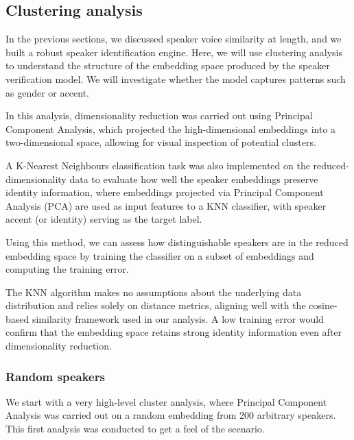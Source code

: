 \documentclass[conference]{IEEEtran}
\begin{document}
	\subsection{Clustering analysis}
	
	In the previous sections, we discussed speaker voice similarity at length, and we built a robust speaker identification engine. Here, we will use clustering analysis to understand the structure of the embedding space produced by the speaker verification model. We will investigate whether the model captures patterns such as gender or accent.
	
	In this analysis, dimensionality reduction was carried out using Principal Component Analysis, which projected the high-dimensional embeddings into a two-dimensional space, allowing for visual inspection of potential clusters.
	
	A K-Nearest Neighbours classification task was also implemented on the reduced-dimensionality data to evaluate how well the speaker embeddings preserve identity information, where embeddings projected via Principal Component Analysis (PCA) are used as input features to a KNN classifier, with speaker accent (or identity) serving as the target label. 
	
	Using this method, we can assess how distinguishable speakers are in the reduced embedding space by training the classifier on a subset of embeddings and computing the training error. 
	
	The KNN algorithm makes no assumptions about the underlying data distribution and relies solely on distance metrics, aligning well with the cosine-based similarity framework used in our analysis. A low training error would confirm that the embedding space retains strong identity information even after dimensionality reduction.
	
	\subsubsection{Random speakers}
	
	
	We start with a very high-level cluster analysis, where Principal Component Analysis was carried out on a random embedding from 200 arbitrary speakers. This first analysis was conducted to get a feel of the scenario.
	
\end{document}
